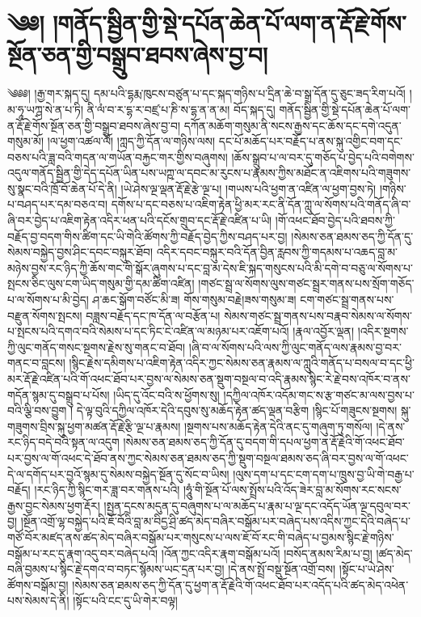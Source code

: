 \chapter{༄༅། །གནོད་སྦྱིན་གྱི་སྡེ་དཔོན་ཆེན་པོ་ལག་ན་རྡོ་རྗེ་གོས་སྔོན་ཅན་གྱི་བསྒྲུབ་ཐབས་ཞེས་བྱ་བ།}༄༅༅། །རྒྱ་གར་སྐད་དུ། དམ་པའི་དྷརྨ་ཁུངས་བཙུན་པ་དང་སྐད་གཉིས་པ་དྲིན་ཆེ་བ་སྒྲ་དོན་དུ་ཅུང་ཟད་རིག་པའོ། །མ་ཧཱ་ཡཀྴ་སེ་ན་པ་ཏི། ནི་ལཾ་བ་ར་དྷ་ར་བཛྲ་པ་ཎི་ས་དྷ་ན་ན་མ། བོད་སྐད་དུ། གནོད་སྦྱིན་གྱི་སྡེ་དཔོན་ཆེན་པོ་ལག་ན་རྡོ་རྗེ་གོས་སྔོན་ཅན་གྱི་བསྒྲུབ་ཐབས་ཞེས་བྱ་བ། དཀོན་མཆོག་གསུམ་ནི་སངས་རྒྱས་དང་ཆོས་དང་དགེ་འདུན་གསུམ་མོ། །ལ་ཕྱག་འཚལ་ལོ། །ཀླད་ཀྱི་དོན་ལ་གཉིས་ལས། དང་པོ་མཆོད་པར་བརྗོད་པ་ནས་སྐུ་འགྱིང་བག་དང་བཅས་པའི་ཟླ་བའི་གདན་ལ་གཡོན་བརྐྱང་གར་གྱིས་བཞུགས། །ཆོས་སྒྲུབ་པ་ལ་བར་དུ་གཅོད་པ་བྱེད་པའི་བགེགས་འདུལ་གནོད་སྦྱིན་གྱི་དེད་དཔོན་ཡིན་པས་ཡཀྵ་ལ་དབང་མ་རུངས་པ་རྣམས་ཀྱིས་མཐོང་ན་འཇིགས་པའི་གཟུགས་སུ་སྣང་བའི་ཁྲོ་བོ་ཆེན་པོ་དེ་ནི། །ཡེ་ཤེས་ལྔ་ལྡན་རྡོ་རྗེ་རྩེ་ལྔ་པ། །གཡས་པའི་ཕྱག་ན་འཛིན་ལ་ཕྱག་བྱས་ཏེ། །གཉིས་པ་བཤད་པར་དམ་བཅའ་བ། དགོས་པ་དང་བཅས་པ་འཇིག་རྟེན་ཕྱི་མར་རང་ནི་དོན་ཀླུ་ལ་སོགས་པའི་གནོད་ཞི་བ་ཞི་བར་བྱེད་པ་འཇིག་རྟེན་འདིར་ཕན་པའི་དངོས་གྲུབ་དང་རྡོ་རྗེ་འཛིན་པ་ཡི། །གོ་འཕང་ཐོབ་བྱེད་པའི་ཐབས་ཀྱི་བརྗོད་བྱ་བདག་གིས་ཚིག་དང་ཡི་གེའི་ཚོགས་ཀྱི་བརྗོད་བྱེད་ཀྱིས་བཤད་པར་བྱ། །སེམས་ཅན་ཐམས་ཅད་ཀྱི་དོན་དུ་སེམས་བསྐྱེད་བྱས་ཤིང་དབང་བསྐུར་ཐོབ། འདིར་དབང་བསྐུར་བའི་དོན་བྱིན་རླབས་ཀྱི་གདམས་པ་འཆད་བླ་མ་མཉེས་བྱས་རང་ཉིད་ཀྱི་ཆོས་གང་གི་སྒོར་ཞུགས་པ་དང་བླ་མ་དེས་ཇི་སྐད་གསུངས་པའི་མི་དགེ་བ་བཅུ་ལ་སོགས་པ་སྤངས་ཅིང་ལུས་ངག་ཡིད་གསུམ་གྱི་དམ་ཚིག་འཛིན། །གཙང་སྦྲ་ལ་སོགས་ལུས་གཙང་སྦྲར་གནས་པས་སྲོག་གཅོད་པ་ལ་སོགས་པ་མི་བྱེད། ཤ་ཆང་སྒོག་བཙོང་མི་ཟ། གོས་གསུམ་བརྗེ།ཟས་གསུམ་ཟ། ངག་གཙང་སྦྲ་གནས་པས་བརྫུན་སོགས་སྤངས། བཟླས་བརྗོད་དང་ཁ་དོན་ལ་བརྩོན་པ། སེམས་གཙང་སྦྲ་གནས་པས་བརྣབ་སེམས་ལ་སོགས་པ་སྤངས་པའི་དགའ་བའི་སེམས་པ་དང་ཏིང་ངེ་འཛིན་ལ་མཉམ་པར་འཇོག་པའོ། །རྣལ་འབྱོར་ལྡན། །འདིར་སྔགས་ཀྱི་ལུང་གནོད་གསང་སྔགས་རྗེས་སུ་གནང་བ་ཐོབ། །ཞི་བ་ལ་སོགས་པའི་ལས་ཀྱི་ལུང་གནོད་ལས་རྣམས་བྱ་བར་གནང་བ་བླངས། །སྙིང་རྗེས་དམིགས་པ་འཇིག་རྟེན་འདིར་ཀྱང་སེམས་ཅན་རྣམས་ལ་ཀླུའི་གནོད་པ་བསལ་བ་དང་ཕྱི་མར་རྡོ་རྗེ་འཛིན་པའི་གོ་འཕང་ཐོབ་པར་བྱས་ལ་སེམས་ཅན་སྡུག་བསྔལ་བ་འདི་རྣམས་སྙིང་རེ་རྗེ་བས་འཁོར་བ་ནས་གདོན་སྙམ་དུ་བསྒྲུབ་པ་པོས། །ཡིད་དུ་འོང་བའི་ས་ཕྱོགས་སུ། །དཀྱིལ་འཁོར་འདོམ་གང་ས་རྩ་གཙང་མ་ལས་བྱས་པ་བའི་ལྕི་བས་བྱུག ། དེ་ལྟ་བུའི་དཀྱིལ་འཁོར་དེའི་དབུས་སུ་མཆོད་རྟེན་ཚད་ལྡན་བརྩིག །སྙིང་པོ་གཟུངས་སྔགས། སྐུ་གཟུགས་བྲིས་སྐུ་ཕྱག་མཚན་རྡོ་རྗེ་རྩི་ལྔ་པ་རྣམས། །སྔགས་པས་མཆོད་རྟེན་དེའི་ནང་དུ་གཞུག་ཏུ་གསོལ། །དེ་ནས་རང་ཉིད་བདེ་བའི་སྟན་ལ་འདུག །སེམས་ཅན་ཐམས་ཅད་ཀྱི་དོན་དུ་བདག་གི་དཔལ་ཕྱག་ན་རྡོ་རྗེའི་གོ་འཕང་ཐོབ་པར་བྱས་ལ་གོ་འཕང་དེ་ཐོབ་ནས་ཀྱང་སེམས་ཅན་ཐམས་ཅད་ཀྱི་སྡུག་བསྔལ་ཐམས་ཅད་ཞི་བར་བྱས་ལ་གོ་འཕང་དེ་ལ་དགོད་པར་བྱའོ་སྙམ་དུ་སེམས་བསྐྱེད་སྔོན་དུ་སོང་བ་ཡིས། །ལུས་དག་པ་དང་ངག་དག་པ་ཁྲུས་བྱ་ཡི་གེ་བརྒྱ་པ་བརྗོད། །རང་ཉིད་ཀྱི་སྙིང་གར་ཟླ་བར་གནས་པའི། །ཧཱུཾ་གི་སྔོན་པོ་ལས་སྤྲོས་པའི་འོད་ཟེར་བླ་མ་སོགས་རང་སངས་རྒྱས་བྱང་སེམས་ཕྱག་རྡོར། །སྤྱན་དྲངས་མདུན་དུ་བཞུགས་པ་ལ་མཆོད་པ་རྣམ་པ་ལྔ་དང་འདོད་ཡོན་ལྔ་དབུལ་བར་བྱ། །སྔོན་འགྲོ་ལྷ་བསྐྱེད་པའི་ཇོ་བོའི་བླ་མ་བིདྱ་ཤྲི་ཚད་མེད་བཞིར་བསྒོམ་པར་བཞེད་པས་འདིས་ཀྱང་དེའི་བཞེད་པ་གཙོ་བོར་མཛད་ནས་ཚད་མེད་བཞིར་བསྒོམ་པར་གསུངས་པ་ལས་ཇོ་བོ་རང་གི་བཞེད་པ་བྱམས་སྙིང་རྗེ་གཉིས་བསྒོམ་པ་རང་དུ་རྣག་འདུ་བར་བཞེད་པའོ། །འོན་ཀྱང་འདིར་རྣག་བསྒོམ་པའོ། །བསོད་ནམས་རིམ་པ་བྱ། །ཚད་མེད་བཞི་བྱམས་པ་སྙིང་རྗེ་དགའ་བ་བཏང་སྙོམས་ཡང་དྲན་པར་བྱ། །དེ་ནས་སྤྲོ་བསྡུ་སྔོན་འགྲོ་བས། །སྟོང་པ་ཡེ་ཤེས་ཚོགས་བསྒོམ་བྱ། །སེམས་ཅན་ཐམས་ཅད་ཀྱི་དོན་དུ་ཕྱག་ན་རྡོ་རྗེའི་གོ་འཕང་ཐོབ་པར་འདོད་པའི་ཚད་མེད་འཕེན་པས་སེམས་དེ་ནི། །སྟོང་པའི་ངང་དུ་ཡི་གེར་བལྟ། 